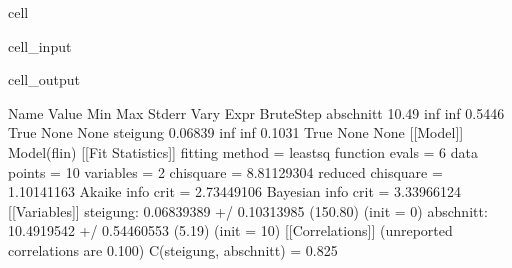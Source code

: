 \documentclass[letterpaper,10pt,english]{jupyterBook}
\begin{document}
\begin{sphinxuseclass}{cell}
\begin{sphinxVerbatimInput}
\begin{sphinxuseclass}{cell_input}
\begin{sphinxVerbatim}[commandchars=\\\{\}]
    \PYG{p}{[}\PYG{p}{]}\PYG{p}{[}\PYG{p}{]}  
\PYG{p}{[}\PYG{p}{]}
\end{sphinxVerbatim}

\end{sphinxuseclass}\end{sphinxVerbatimInput}
\begin{sphinxVerbatimOutput}

\begin{sphinxuseclass}{cell_output}
\begin{sphinxVerbatim}[commandchars=\\\{\}]
Name          Value      Min      Max   Stderr     Vary     Expr Brute\PYGZus{}Step
abschnitt     10.49     \PYGZhy{}inf      inf   0.5446     True     None     None
steigung   \PYGZhy{}0.06839     \PYGZhy{}inf      inf   0.1031     True     None     None
[[Model]]
    Model(f\PYGZus{}lin)
[[Fit Statistics]]
    \PYGZsh{} fitting method   = leastsq
    \PYGZsh{} function evals   = 6
    \PYGZsh{} data points      = 10
    \PYGZsh{} variables        = 2
    chi\PYGZhy{}square         = 8.81129304
    reduced chi\PYGZhy{}square = 1.10141163
    Akaike info crit   = 2.73449106
    Bayesian info crit = 3.33966124
[[Variables]]
    steigung:  \PYGZhy{}0.06839389 +/\PYGZhy{} 0.10313985 (150.80\PYGZpc{}) (init = 0)
    abschnitt:  10.4919542 +/\PYGZhy{} 0.54460553 (5.19\PYGZpc{}) (init = 10)
[[Correlations]] (unreported correlations are \PYGZlt{} 0.100)
    C(steigung, abschnitt) = \PYGZhy{}0.825
\end{sphinxVerbatim}


\end{sphinxuseclass}
\end{sphinxVerbatimOutput}
\end{sphinxuseclass}
\end{document}
